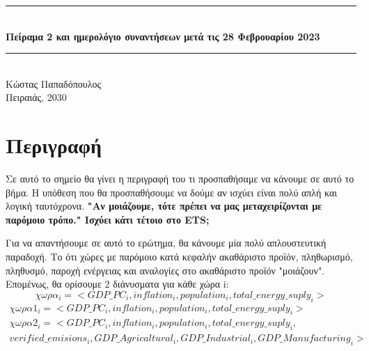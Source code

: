 \documentclass[a4paper,twoside,10pt]{article}
\begin{document}
	\begin{titlepage}
		\newcommand{\HRule}{\rule{\linewidth}{0.5mm}} %
		
		\center %
		
		
		
		
		\HRule \\[0.75cm]
		
		{ \huge \bfseries Πείραμα 2 και ημερολόγιο συναντήσεων μετά τις 28 Φεβρουαρίου 2023}
		\\[0.4cm] %
		\HRule \\[1cm]
		
		{ \large Κώστας Παπαδόπουλος}\\[1cm] %
		{ \large Πειραιάς, 2030}\\[1cm] %
		\tableofcontents
		
		\vfill %
	\end{titlepage}
	
	
	\section{Περιγραφή}
	Σε αυτό το σημείο θα γίνει η περιγραφή του τι προσπαθήσαμε να κάνουμε σε αυτό το βήμα. Η υπόθεση που θα προσπαθήσουμε να δούμε αν ισχύει είναι πολύ απλή και λογική ταυτόχρονα. {\bfseries "Αν μοιάζουμε, τότε πρέπει να μας μεταχειρίζονται με παρόμοιο τρόπο." Ισχύει κάτι τέτοιο στο ETS;}
	
	Για να απαντήσουμε σε αυτό το ερώτημα, θα κάνουμε μία πολύ απλουστευτική παραδοχή. Το ότι χώρες με παρόμοιο κατά κεφαλήν ακαθάριστο προϊόν, πληθωρισμό, πληθυσμό, παροχή ενέργειας και αναλογίες στο ακαθάριστο προϊόν "μοιάζουν".
	Επομένως, θα ορίσουμε 2 διάνυσματα για κάθε χώρα i:
	$$\chi \omega \rho \alpha _i = <GDP\_PC_{i}, inflation_i, population_i, total\_energy\_suply_i> 
	$$
	\begin{align*} 
		\chi \omega \rho \alpha1 _i = <GDP\_PC_{i}, inflation_i, population_i, total\_energy\_suply_i>  \\ 
		\chi \omega \rho \alpha2 _i = <GDP\_PC_{i}, inflation_i, population_i, total\_energy\_suply_i, \\
		verified\_emisions_i, GDP\_Agricaltural_i, GDP\_Industrial_i, GDP\_Manufacturing_i>
	\end{align*}
	
\end{document}
